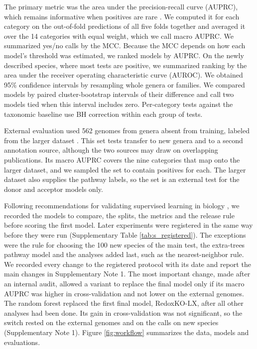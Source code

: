 \documentclass[10pt,a4paper,onecolumn]{article}
\begin{document}
The primary metric was the area under the precision-recall curve
(AUPRC), which remains informative when positives are rare
\autocite{Saito2015}. We computed it for each category on the
out-of-fold predictions of all five folds together and averaged it over
the 14 categories with equal weight, which we call macro AUPRC. We
summarized yes/no calls by the MCC. Because the MCC depends on how each
model's threshold was estimated, we ranked models by AUPRC. On the newly
described species, where most tests are positive, we summarized ranking
by the area under the receiver operating characteristic curve (AUROC).
We obtained 95\% confidence intervals by resampling whole genera or
families. We compared models by paired cluster-bootstrap intervals of
their difference and call two models tied when this interval includes
zero. Per-category tests against the taxonomic baseline use BH
correction within each group of tests.

External evaluation used 562 genomes from genera absent from training,
labeled from the larger dataset \autocite{Madin2020}. This set tests
transfer to new genera and to a second annotation source, although the
two sources may draw on overlapping publications. Its macro AUPRC covers
the nine categories that map onto the larger dataset, and we sampled the
set to contain positives for each. The larger dataset also supplies the
pathway labels, so the set is an external test for the donor and
acceptor models only.

Following recommendations for validating supervised learning in biology
\autocite{Walsh2021}, we recorded the models to compare, the splits, the
metrics and the release rule before scoring the first model. Later
experiments were registered in the same way before they were run
(Supplementary Table \ref{tab:s_registered}). The exceptions were the
rule for choosing the 100 new species of the main test, the extra-trees
pathway model and the analyses added last, such as the nearest-neighbor
rule. We recorded every change to the registered protocol with its date
and report the main changes in Supplementary Note 1. The most important
change, made after an internal audit, allowed a variant to replace the
final model only if its macro AUPRC was higher in cross-validation and
not lower on the external genomes. The random forest replaced the first
final model, RedoxKO-LX, after all other analyses had been done. Its
gain in cross-validation was not significant, so the switch rested on
the external genomes and on the calls on new species (Supplementary Note
1). Figure \ref{fig:workflow} summarizes the data, models and
evaluations.
\end{document}
